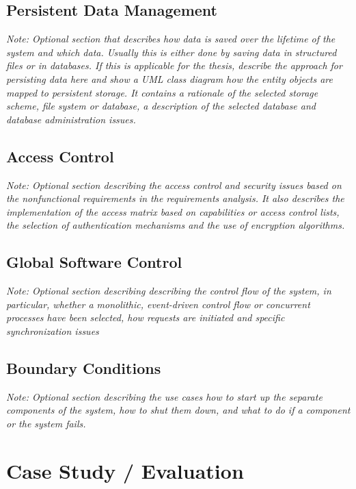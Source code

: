 \documentclass[a4paper,12pt,twoside]{report}
\begin{document}
\section{Persistent Data Management}

\textit{Note: Optional section that describes how data is saved over the lifetime of the system and which data. Usually this is either done by saving data in structured files or in databases. If this is applicable for the thesis, describe the approach for persisting data here and show a UML class diagram how the entity objects are mapped to persistent storage.
It contains a rationale of the selected storage scheme, file system or database, a description of the selected database and database administration issues.}

\section{Access Control}

\textit{Note: Optional section describing the access control and security issues based on the nonfunctional requirements in the requirements analysis. It also describes the implementation of the access matrix based on capabilities or access control lists, the selection of  authentication mechanisms and the use of encryption algorithms.}

\section{Global Software Control}

\textit{Note: Optional section describing describing the control flow of the system, in particular, whether a monolithic, event-driven control flow or concurrent processes have been selected, how requests are initiated and specific synchronization issues}


\section{Boundary Conditions}

\textit{Note: Optional section describing the use cases how to start up the separate components of the system, how to shut them down, and what to do if a component or the system fails.}






\chapter{Case Study / Evaluation}
\end{document}
